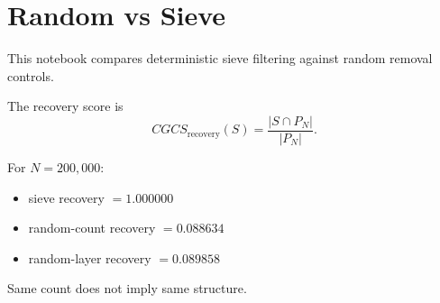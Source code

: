 \section*{Random vs Sieve}

This notebook compares deterministic sieve filtering against random removal controls.

The recovery score is
\[
CGCS_{\mathrm{recovery}}(S)=
\frac{|S\cap P_N|}{|P_N|}.
\]

For $N=200,000$:
\begin{itemize}
  \item sieve recovery $= 1.000000$
  \item random-count recovery $= 0.088634$
  \item random-layer recovery $= 0.089858$
\end{itemize}

Same count does not imply same structure.
